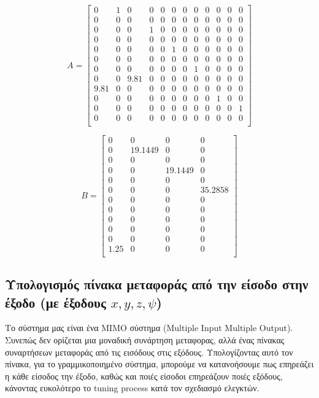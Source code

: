 \documentclass[a4paper,12pt]{article}
\begin{document}
\begin{equation}
A = 
\begin{bmatrix}
 0 & 1 & 0 & 0 & 0 & 0 & 0 & 0 & 0 & 0 & 0 & 0 \\
0 & 0 & 0 & 0 & 0 & 0 & 0 & 0 & 0 & 0 & 0 & 0 \\
0 & 0 & 0 & 1 & 0 & 0 & 0 & 0 & 0 & 0 & 0 & 0 \\
0 & 0 & 0 & 0 & 0 & 0 & 0 & 0 & 0 & 0 & 0 & 0 \\
0 & 0 & 0 & 0 & 0 & 1 & 0 & 0 & 0 & 0 & 0 & 0 \\
0 & 0 & 0 & 0 & 0 & 0 & 0 & 0 & 0 & 0 & 0 & 0 \\
0 & 0 & 0 & 0 & 0 & 0 & 0 & 1 & 0 & 0 & 0 & 0 \\
0 & 0 & 9.81 & 0 & 0 & 0 & 0 & 0 & 0 & 0 & 0 & 0 \\
9.81 & 0 & 0 & 0 & 0 & 0 & 0 & 0 & 0 & 0 & 0 & 0 \\
0 & 0 & 0 & 0 & 0 & 0 & 0 & 0 & 0 & 1 & 0 & 0 \\
0 & 0 & 0 & 0 & 0 & 0 & 0 & 0 & 0 & 0 & 0 & 1 \\
0 & 0 & 0 & 0 & 0 & 0 & 0 & 0 & 0 & 0 & 0 & 0 \\
\end{bmatrix}
\end{equation}


\begin{equation*}
B = 
\begin{bmatrix}
0 & 0 & 0 & 0 \\
0 & 19.1449 & 0 & 0 \\
0 & 0 & 0 & 0 \\
0 & 0 & 19.1449 & 0 \\
0 & 0 & 0 & 0 \\
0 & 0 & 0 & 35.2858 \\
0 & 0 & 0 & 0 \\
0 & 0 & 0 & 0 \\
0 & 0 & 0 & 0 \\
0 & 0 & 0 & 0 \\
0 & 0 & 0 & 0 \\
1.25 & 0 & 0 & 0 \\
\end{bmatrix}
\end{equation*}

\newpage
\subsection{Υπολογισμός πίνακα μεταφοράς από την είσοδο στην έξοδο (με έξοδους $x, y, z, \psi$)}
Το σύστημα μας είναι ένα MIMO σύστημα (Multiple Input Multiple Output). Συνεπώς δεν ορίζεται μια μοναδική συνάρτηση μεταφορας, αλλά ένας πίνακας συναρτήσεων μεταφοράς από τις εισόδους στις εξόδους. Υπολογίζοντας αυτό τον πίνακα, για το γραμμικοποιημένο σύστημα, μπορούμε να κατανοήσουμε πως επηρεάζει η κάθε είσοδος την έξοδο, καθώς και ποιές είσοδοι επηρεάζουν ποιές εξόδους, κάνοντας ευκολότερο το tuning process κατά τον σχεδιασμό ελεγκτών.
\end{document}
